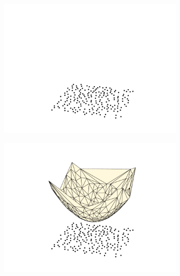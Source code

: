 \begin{figure}[bt]
	\centering
     
          \begin{subfigure}[b]{0.4\textwidth}
         \centering
         \includegraphics[width=\textwidth]{./appendices/figures/power_1.pdf}
         \caption{}
         \label{appfig:vorconvexhull1}
     \end{subfigure}
   	\hspace{1cm}
      \begin{subfigure}[b]{0.4\textwidth}
         \centering
         \includegraphics[width=\textwidth]{./appendices/figures/power_2.pdf}
         \caption{}
         \label{appfig:vorconvexhull2}
     \end{subfigure}
     

\end{figure}
